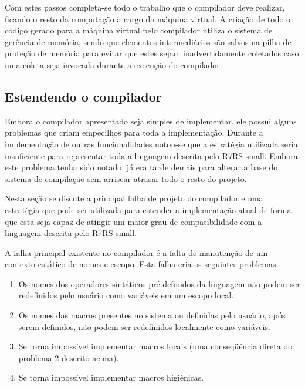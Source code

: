 Com estes passos completa-se todo o trabalho que o compilador deve realizar,
ficando o resto da computação a cargo da máquina virtual. A criação de todo o
código gerado para a máquina virtual pelo compilador utiliza o sistema de 
gerência de memória, sendo que elementos intermediários são salvos na pilha de 
proteção de memória para evitar que estes sejam inadvertidamente coletados caso
uma coleta seja invocada durante a execução do compilador. 

\subsection{Estendendo o compilador}
\label{ss:solucoes-compilador}

Embora o compilador apresentado seja simples de implementar,
ele possui alguns problemas que criam empecilhos para toda a implementação.
Durante a implementação de outras funcionalidades notou-se que a estratégia
utilizada seria insuficiente para representar toda a linguagem descrita pelo
\acs{R7RS}-small. Embora este problema tenha sido notado, já era tarde demais
para alterar a base do sistema de compilação sem arriscar atrasar todo o resto
do projeto.

Nesta seção se discute a principal falha de projeto do compilador e uma
estratégia que pode ser utilizada para estender a implementação atual de forma
que esta seja capaz de atingir um maior grau de compatibilidade com a linguagem
descrita pelo \acs{R7RS}-small.

A falha principal existente no compilador é a falta de manutenção de um
contexto estático de nomes e escopo. Esta falha cria os seguintes problemas:

\begin{enumerate}[I]

 \item Os nomes dos operadores sintáticos pré-definidos da linguagem não podem
ser redefinidos pelo usuário como variáveis em um escopo local.

 \item Os nomes das macros presentes no sistema ou definidas pelo usuário, após
serem definidos, não podem ser redefinidos localmente como variáveis.

 \item Se torna impossível implementar macros locais (uma conseqüência direta
do problema 2 descrito acima).
 
 \item Se torna impossível implementar macros higiênicas.

\end{enumerate}


